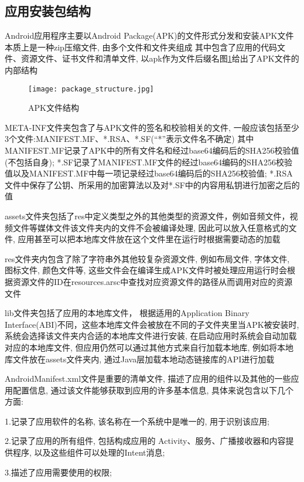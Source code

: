 \subsection{应用安装包结构}
Android应用程序主要以Android Package(APK)的文件形式分发和安装\juhao APK文件本质上是一种zip压缩文件, 由多个文件和文件夹组成 其中包含了应用的代码文件、资源文件、证书文件和清单文件, 以apk作为文件后缀名\juhao 图\ref{packageStructure}给出了APK文件的内部结构\juhao
\begin{figure}[ht]
	\centering
	\texttt{[image: package\_structure.jpg]}
	\caption{APK文件结构}
	\label{packageStructure}
\end{figure}

META-INF文件夹包含了与APK文件的签名和校验相关的文件, 一般应该包括至少3个文件:MANIFEST.MF、*.RSA、*.SF(“*”表示文件名不确定)\juhao 
其中MANIFEST.MF记录了APK中的所有文件名和经过base64编码后的SHA256校验值(不包括自身);
*.SF记录了MANIFEST.MF文件的经过base64编码的SHA256校验值以及MANIFEST.MF中每一项记录经过base64编码后的SHA256校验值;
*.RSA文件中保存了公钥、所采用的加密算法以及对*.SF中的内容用私钥进行加密之后的值\juhao

assets文件夹包括了res中定义类型之外的其他类型的资源文件，例如音频文件，视频文件等媒体文件\juhao 该文件夹内的文件不会被编译处理, 因此可以放入任意格式的文件, 应用甚至可以把本地库文件放在这个文件里在运行时根据需要动态的加载\juhao

res文件夹内包含了除了字符串外其他较复杂资源文件, 例如布局文件, 字体文件, 图标文件, 颜色文件等, 这些文件会在编译生成APK文件时被处理\juhao 应用运行时会根据资源文件的ID在resources.arsc中查找对应资源文件的路径从而调用对应的资源文件\juhao

lib文件夹包括了应用的本地库文件， 根据适用的Application Binary Interface(ABI)不同，这些本地库文件会被放在不同的子文件夹里\juhao 当APK被安装时, 系统会选择该文件夹内合适的本地库文件进行安装, 在启动应用时系统会自动加载对应的本地库文件, 但应用仍然可以通过其他方式来自行加载本地库, 例如将本地库文件放在assets文件夹内, 通过Java层加载本地动态链接库的API进行加载\juhao

AndroidManifest.xml文件是重要的清单文件, 描述了应用的组件以及其他的一些应用配置信息, 通过该文件能够获取到应用的许多基本信息, 具体来说包含以下几个方面:

1.记录了应用软件的名称, 该名称在一个系统中是唯一的, 用于识别该应用;

2.记录了应用的所有组件, 包括构成应用的 Activity、服务、广播接收器和内容提供程序, 以及这些组件可以处理的Intent消息;

3.描述了应用需要使用的权限;

